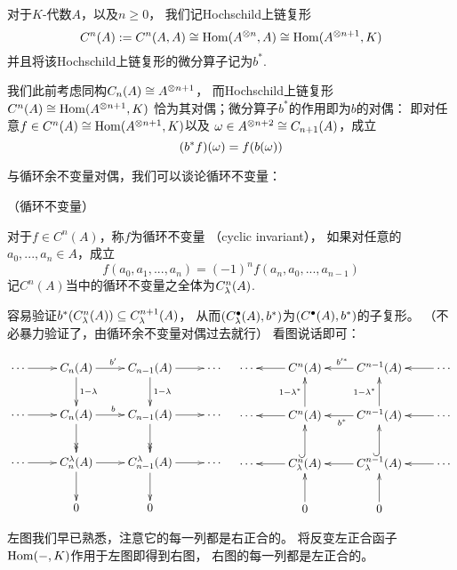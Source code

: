\begin{notation}对于$K$-代数$A$，以及$n\geq0$，
我们记Hochschild上链复形
$$C^n(A):=C^{n}(A,A)\cong\operatorname{Hom}(A^{\otimes n},A)
\cong\operatorname{Hom}(A^{\otimes n+1},K)$$
并且将该Hochschild上链复形的微分算子记为$b^*$.
\end{notation}

我们此前考虑同构$C_n(A)\cong A^{\otimes n+1}$，
而Hochschild上链复形$C^n(A)\cong\operatorname{Hom}(A^{\otimes n+1},K)$
恰为其对偶；微分算子$b^*$的作用即为$b$的对偶：
即对任意$f\in C^n(A)\cong\operatorname{Hom}(A^{\otimes n+1},K)$以及
$\omega\in A^{\otimes n+2}\cong C_{n+1}(A)$，成立
$$(b^*f)(\omega)=f(b(\omega))$$

与循环余不变量对偶，我们可以谈论循环不变量：

\begin{definition}（循环不变量）

对于$f\in C^n(A)$，称$f$为循环不变量
（cyclic invariant），
如果对任意的$a_0,...,a_n\in A$，成立
$$f(a_0,a_1,...,a_n)=(-1)^nf(a_n,a_0,...,a_{n-1})$$
记$C^n(A)$当中的循环不变量之全体为$C^n_{\lambda}(A)$.
\end{definition}

容易验证$b^*(C^{n}_{\lambda}(A))\subseteq C^{n+1}_{\lambda}(A)$，
从而$(C^{\bullet}_{\lambda}(A),b^*)$为$(C^{\bullet}(A),b^*)$的子复形。
（不必暴力验证了，由循环余不变量对偶过去就行）
看图说话即可：

$$
  \xymatrix{
     \cdots       \ar[r]
    &C_n(A)       \ar[r]^{b'}   \ar[d]^{1-\lmd}
    &C_{n-1}(A)   \ar[r]        \ar[d]^{1-\lmd}
    &\cdots
  \\
     \cdots       \ar[r]
    &C_n(A)       \ar[r]^{b }   \ar@{->>}[d]
    &C_{n-1}(A)   \ar[r]        \ar@{->>}[d]
    &\cdots
  \\
     \cdots       \ar[r]
    &C_n^{\lmd}(A)\ar[r]        \ar[d]
    &C_{n-1}^{\lmd}(A) \ar[r]   \ar[d]
    &\cdots
  \\
    &0&0&
  }
\quad
  \xymatrix{
     \cdots
    &C^n(A)       \ar[l]
    &C^{n-1}(A)   \ar[l]_{b'^*}
    &\cdots       \ar[l]
  \\
     \cdots
    &C^n(A)       \ar[l]        \ar[u]^{1-\lmd^*}
    &C^{n-1}(A)   \ar[l]^{b^*}  \ar[u]^{1-\lmd^*}
    &\cdots       \ar[l]
  \\
     \cdots
    &C^n_{\lmd}(A)\ar[l]        \ar@{^{(}->}[u]
    &C^{n-1}_{\lmd}(A) \ar[l]   \ar@{^{(}->}[u]
    &\cdots            \ar[l]
  \\
    &0\ar[u]
    &0\ar[u]
    &
  }
$$

左图我们早已熟悉，注意它的每一列都是右正合的。
将反变左正合函子$\operatorname{Hom}(-,K)$作用于左图即得到右图，
右图的每一列都是左正合的。


